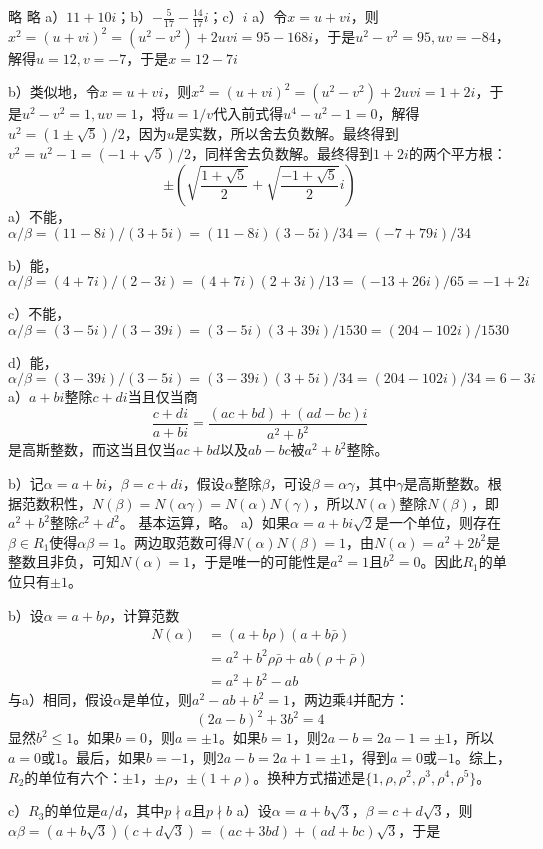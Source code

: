 %
\exercise 略
%
\exercise 略
%
\exercise a）$11+10i$；b）$-\frac{5}{17}-\frac{14}{17}i$；c）$i$
%
\exercise a）令$x=u+vi$，则$x^2=(u+vi)^2=(u^2-v^2)+2uvi=95-168i$，于是$u^2-v^2=95, uv=-84$，解得$u=12, v=-7$，于是$x=12-7i$\par
b）类似地，令$x=u+vi$，则$x^2=(u+vi)^2=(u^2-v^2)+2uvi=1+2i$，于是$u^2-v^2=1, uv=1$，将$u=1/v$代入前式得$u^4-u^2-1=0$，解得$u^2=(1\pm\sqrt5)/2$，因为$u$是实数，所以舍去负数解。最终得到$v^2=u^2-1=(-1+\sqrt5)/2$，同样舍去负数解。最终得到$1+2i$的两个平方根：
\[\pm\left(\sqrt{\frac{1+\sqrt5}{2}} + \sqrt{\frac{-1+\sqrt5}{2}}i\right)\]
%
\exercise a）不能，$\alpha/\beta=(11-8i)/(3+5i)=(11-8i)(3-5i)/34=(-7+79i)/34$\par
b）能，$\alpha/\beta=(4+7i)/(2-3i)=(4+7i)(2+3i)/13=(-13+26i)/65=-1+2i$\par
c）不能，$\alpha/\beta=(3-5i)/(3-39i)=(3-5i)(3+39i)/1530=(204-102i)/1530$\par
d）能，$\alpha/\beta=(3-39i)/(3-5i)=(3-39i)(3+5i)/34=(204-102i)/34=6-3i$
%
\exercise a）\proof $a+bi$整除$c+di$当且仅当商
\[\frac{c+di}{a+bi}=\frac{(ac+bd) + (ad-bc)i}{a^2+b^2}\]
是高斯整数，而这当且仅当$ac+bd$以及$ab-bc$被$a^2+b^2$整除。\par
b）\proof 记$\alpha=a+bi$，$\beta=c+di$，假设$\alpha$整除$\beta$，可设$\beta=\alpha\gamma$，其中$\gamma$是高斯整数。根据范数积性，$N(\beta)=N(\alpha\gamma)=N(\alpha)N(\gamma)$，所以$N(\alpha)$整除$N(\beta)$，即$a^2+b^2$整除$c^2+d^2$。
%
\exercise 基本运算，略。
%
\exercise a）如果$\alpha=a+bi\sqrt2$是一个单位，则存在$\beta\in R_1$使得$\alpha\beta=1$。两边取范数可得$N(\alpha)N(\beta)=1$，由$N(\alpha)=a^2+2b^2$是整数且非负，可知$N(\alpha)=1$，于是唯一的可能性是$a^2=1$且$b^2=0$。因此$R_1$的单位只有$\pm1$。\par
b）设$\alpha=a+b\rho$，计算范数
\begin{align*}
N(\alpha)&=(a+b\rho)(a+b\bar\rho) \\
&=a^2+b^2\rho\bar\rho + ab(\rho+\bar\rho) \\
&=a^2+b^2-ab
\end{align*}
与a）相同，假设$\alpha$是单位，则$a^2-ab+b^2=1$，两边乘4并配方：
\[(2a-b)^2+3b^2=4\]
显然$b^2\le1$。如果$b=0$，则$a=\pm1$。如果$b=1$，则$2a-b=2a-1=\pm1$，所以$a=0$或$1$。最后，如果$b=-1$，则$2a-b=2a+1=\pm1$，得到$a=0$或$-1$。综上，$R_2$的单位有六个：$\pm1$，$\pm\rho$，$\pm(1+\rho)$。换种方式描述是$\{1,\rho,\rho^2,\rho^3,\rho^4,\rho^5\}$。\par
c）$R_3$的单位是$a/d$，其中$p\nmid a$且$p\nmid b$
%
\exercise a）\proof 设$\alpha=a+b\sqrt3$，$\beta=c+d\sqrt3$，则$\alpha\beta=(a+b\sqrt3)(c+d\sqrt3)=(ac+3bd)+(ad+bc)\sqrt3$，于是
